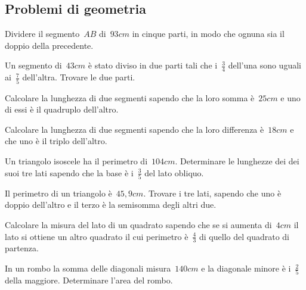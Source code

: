 \subsection{Problemi di geometria}
\begin{multicols}{2}
\begin{esercizio}[\Ast]
\label{ese:16.102}
Dividere il segmento~$AB$ di~$93\unit{cm}$ in cinque parti, in modo che ognuna sia il doppio della precedente.
\end{esercizio}

\begin{esercizio}[\Ast]
\label{ese:16.103}
Un segmento di~$43\unit{cm}$ è stato diviso in due parti tali che i~$\frac{3}{4}$ dell'una sono uguali ai~$\frac{7}{5}$ dell'altra. Trovare le due parti.
\end{esercizio}

\begin{esercizio}[\Ast]
\label{ese:16.104}
Calcolare la lunghezza di due segmenti sapendo che la loro somma è~$25\unit{cm}$ e uno di essi è il quadruplo dell'altro.
\end{esercizio}

\begin{esercizio}[\Ast]
\label{ese:16.105}
Calcolare la lunghezza di due segmenti sapendo che la loro differenza è~$18\unit{cm}$ e che uno è il triplo dell'altro.
\end{esercizio}

\begin{esercizio}[\Ast]
\label{ese:16.106}
Un triangolo isoscele ha il perimetro di~$104\unit{cm}$. Determinare le lunghezze dei dei suoi tre lati sapendo che la base è i~$\frac{3}{5}$ del lato obliquo.
\end{esercizio}

\begin{esercizio}[\Ast]
\label{ese:16.107}
Il perimetro di un triangolo è~$45,9\unit{cm}$. Trovare i tre lati, sapendo che uno è doppio dell'altro e il terzo è la semisomma degli altri due.
\end{esercizio}

\begin{esercizio}[\Ast]
\label{ese:16.108}
Calcolare la misura del lato di un quadrato sapendo che se si aumenta di~$4\unit{cm}$ il lato si ottiene un altro quadrato il cui perimetro è~$\frac{4}{3}$ di quello del quadrato di partenza.
\end{esercizio}

\begin{esercizio}[\Ast]
\label{ese:16.109}
In un rombo la somma delle diagonali misura~$140\unit{cm}$ e la diagonale minore è i~$\frac{2}{5}$ della maggiore. Determinare l'area del rombo.
\end{esercizio}


\end{multicols}
